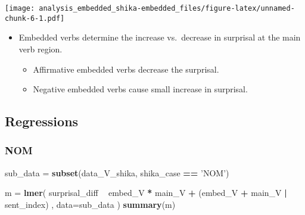 \documentclass[]{ltjsarticle}
\newenvironment{Shaded}{\begin{snugshade}}{\end{snugshade}}
\newcommand{\KeywordTok}[1]{\textcolor[rgb]{0.13,0.29,0.53}{\textbf{#1}}}
\newcommand{\DataTypeTok}[1]{\textcolor[rgb]{0.13,0.29,0.53}{#1}}
\newcommand{\StringTok}[1]{\textcolor[rgb]{0.31,0.60,0.02}{#1}}
\newcommand{\OperatorTok}[1]{\textcolor[rgb]{0.81,0.36,0.00}{\textbf{#1}}}
\newcommand{\NormalTok}[1]{#1}
\providecommand{\tightlist}{%
  \setlength{\itemsep}{0pt}\setlength{\parskip}{0pt}}
\begin{document}
\texttt{[image: analysis\_embedded\_shika-embedded\_files/figure-latex/unnamed-chunk-6-1.pdf]}

\begin{itemize}
\tightlist
\item
  Embedded verbs determine the increase vs.~decrease in surprisal at the
  main verb region.

  \begin{itemize}
  \tightlist
  \item
    Affirmative embedded verbs decrease the surprisal.
  \item
    Negative embedded verbs cause small increase in surprisal.
  \end{itemize}
\end{itemize}

\subsection{Regressions}\label{regressions-1}

\subsubsection{NOM}\label{nom-1}

\begin{Shaded}
\begin{Highlighting}[]
\NormalTok{sub_data =}\StringTok{ }\KeywordTok{subset}\NormalTok{(data_V_shika, shika_case }\OperatorTok{==}\StringTok{ 'NOM'}\NormalTok{)}

\NormalTok{m =}\StringTok{ }\KeywordTok{lmer}\NormalTok{(}
\NormalTok{        surprisal_diff}
            \OperatorTok{~}\StringTok{ }\NormalTok{embed_V }\OperatorTok{*}\StringTok{ }\NormalTok{main_V}
                \OperatorTok{+}\StringTok{ }\NormalTok{(embed_V }\OperatorTok{+}\StringTok{ }\NormalTok{main_V }\OperatorTok{|}\StringTok{ }\NormalTok{sent_index)}
\NormalTok{        ,}
        \DataTypeTok{data=}\NormalTok{sub_data}
\NormalTok{        )}
\KeywordTok{summary}\NormalTok{(m)}
\end{Highlighting}
\end{Shaded}
\end{document}
